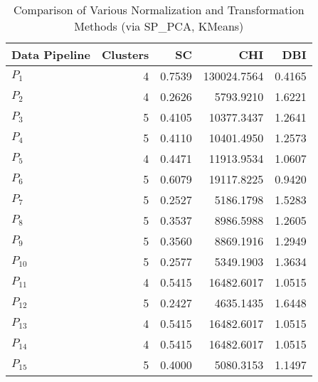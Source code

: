\begin{table}[t]
\centering
\caption{Comparison of Various Normalization and Transformation Methods (via SP_PCA, KMeans)}
\label{tbl:Comparison_SP_PCA_KMeans_norm_tran}
\begin{tabular}{lrrrr}
\toprule
Data Pipeline &  Clusters &     SC &         CHI &    DBI \\
\midrule
      $P_{1}$ &         4 & 0.7539 & 130024.7564 & 0.4165 \\
      $P_{2}$ &         4 & 0.2626 &   5793.9210 & 1.6221 \\
      $P_{3}$ &         5 & 0.4105 &  10377.3437 & 1.2641 \\
      $P_{4}$ &         5 & 0.4110 &  10401.4950 & 1.2573 \\
      $P_{5}$ &         4 & 0.4471 &  11913.9534 & 1.0607 \\
      $P_{6}$ &         5 & 0.6079 &  19117.8225 & 0.9420 \\
      $P_{7}$ &         5 & 0.2527 &   5186.1798 & 1.5283 \\
      $P_{8}$ &         5 & 0.3537 &   8986.5988 & 1.2605 \\
      $P_{9}$ &         5 & 0.3560 &   8869.1916 & 1.2949 \\
     $P_{10}$ &         5 & 0.2577 &   5349.1903 & 1.3634 \\
     $P_{11}$ &         4 & 0.5415 &  16482.6017 & 1.0515 \\
     $P_{12}$ &         5 & 0.2427 &   4635.1435 & 1.6448 \\
     $P_{13}$ &         4 & 0.5415 &  16482.6017 & 1.0515 \\
     $P_{14}$ &         4 & 0.5415 &  16482.6017 & 1.0515 \\
     $P_{15}$ &         5 & 0.4000 &   5080.3153 & 1.1497 \\
\bottomrule
\end{tabular}
\end{table}
